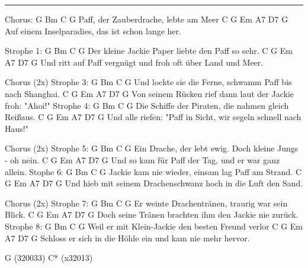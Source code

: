 \noindent\rule{\columnwidth}{1pt}

\begin{lstsong}
Chorus:
G               Bm      C        G
Paff, der Zauberdrache, lebte am Meer
    C          G   Em        A7           D7 G
Auf einem Inselparadies, das ist schon lange her.

Strophe 1:
    G             Bm     C                 G
Der kleine Jackie Paper liebte den Paff so sehr.
    C                G         Em       A7   D7       G
Und ritt auf Paff vergnügt und froh oft über Land und Meer.

Chorus (2x)
Strophe 3:
    G              Bm             C                  G
Und lockte sie die Ferne, schwamm Paff bis nach Shanghai.
    C             G         Em       A7     D7      G
Von seinem Rücken rief dann laut der Jackie froh: "Ahoi!"
Strophe 4:
    G             Bm         C                 G
Die Schiffe der Piraten, die nahmen gleich Reißaus.
    C             G       Em         A7     D7           G
Und alle riefen: "Paff in Sicht, wir segeln schnell nach Haus!"

Chorus (2x)
Strophe 5:
    G                Bm         C                 G
Ein Drache, der lebt ewig. Doch kleine Jungs - oh nein. 
    C          G        Em       A7     D7     G
Und so kam für Paff der Tag, und er war ganz allein.
Stophe 6:
G              Bm      C                  G
Jackie kam nie wieder, einsam lag Paff am Strand. 
    C               G      Em           A7      D7      G
Und hieb mit seinem Drachenschwanz hoch in die Luft den Sand.

Chorus (2x)
Strophe 7:
   G             Bm      C                G
Er weinte Drachentränen, traurig war sein Blick.
     C            G        Em      A7     D7    G
Doch seine Tränen brachten ihm den Jackie nie zurück.
Strophe 8:
G                 Bm         C             G
Weil er mit Klein-Jackie den besten Freund verlor
        C              G     Em      A7      D7      G
Schloss er sich in die Höhle ein und kam nie mehr hervor.

G  (320033)  C* (x32013)
\end{lstsong}
\newpage



